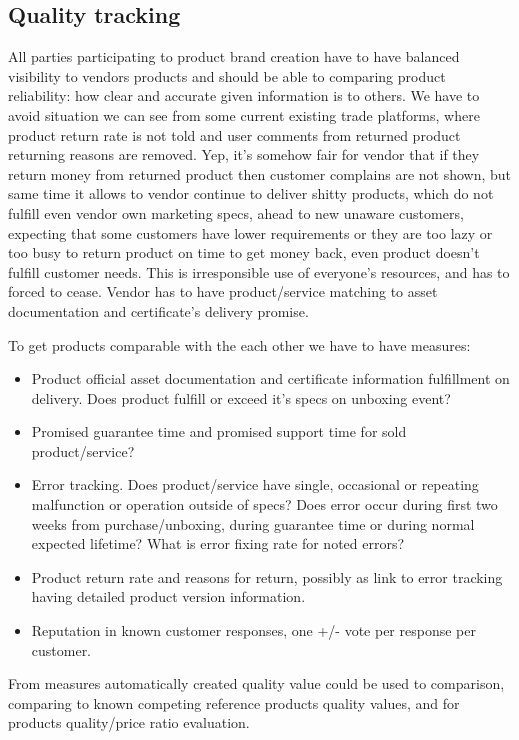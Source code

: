 \subsection{Quality tracking}
\label{quality_tracking}

All parties participating to product brand creation have to have balanced
visibility to vendors products and should be able to comparing product
reliability: how clear and accurate given information is to others. We have to
avoid situation we can see from some current existing trade platforms, where
product return rate is not told and user comments from returned product
returning reasons are removed. Yep, it's somehow fair for vendor that if they
return money from returned product then customer complains are not shown, but
same time it allows to vendor continue to deliver shitty products, which do
not fulfill even vendor own marketing specs, ahead to new unaware customers,
expecting that some customers have lower requirements or they are too lazy or
too busy to return product on time to get money back, even product doesn't
fulfill customer needs. This is irresponsible use of everyone's resources, and
has to forced to cease. Vendor has to have product/service matching to asset
documentation and certificate's delivery promise.

To get products comparable with the each other we have to have measures:
\begin{itemize}
\item Product official asset documentation and certificate information
 fulfillment on delivery. Does product fulfill or exceed it's specs on
 unboxing event?
\item Promised guarantee time and promised support time for sold
 product/service?
\item Error tracking. Does product/service have single, occasional or
 repeating malfunction or operation outside of specs? Does error occur during
 first two weeks from purchase/unboxing, during guarantee time or during
 normal expected lifetime? What is error fixing rate for noted errors?
\item Product return rate and reasons for return, possibly as link to error
 tracking having detailed product version information.
\item Reputation in known customer responses, one +/- vote per response per
 customer.
\end{itemize}

From measures automatically created quality value could be used to comparison,
comparing to known competing reference products quality values, and for
products quality/price ratio evaluation.

